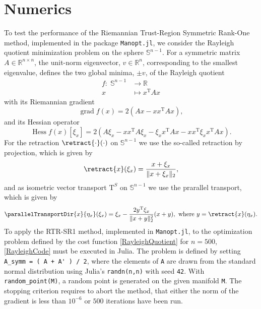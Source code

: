 \chapter{Numerics}

To test the performance of the Riemannian Trust-Region Symmetric Rank-One method, implemented in the package \lstinline!Manopt.jl!, we consider the Rayleigh quotient minimization problem on the sphere $\mathbb{S}^{n-1}$. For a symmetric matrix $A \in \mathbb{R}^{n \times n}$, the unit-norm eigenvector, $v \in \mathbb{R}^n$, corresponding to the smallest eigenvalue, defines the two global minima, $\pm v$, of the Rayleigh quotient  
\begin{equation}\label{RayleighQuotient}
    \begin{split}
        f \colon \; \mathbb{S}^{n-1} & \to \mathbb{R} \\
        x & \mapsto x^{\mathrm{T}} A x 
    \end{split}
\end{equation}   
with its Riemannian gradient 
\begin{equation*}
    \operatorname{grad} f(x) = 2(Ax - x x^{\mathrm{T}} A x),
\end{equation*}
and its Hessian operator
\begin{equation}\label{RayleighHessian}
    \operatorname{Hess} f(x) [\xi_x] = 2 (A \xi_x - x x^{\mathrm{T}} A \xi_x - \xi_x x^{\mathrm{T}} A x - x x^{\mathrm{T}} \xi_x x^{\mathrm{T}} A x).
\end{equation}
For the retraction $\retract{\cdot}(\cdot)$ on $\mathbb{S}^{n-1}$ we use the so-called retraction by projection, which is given by
\begin{equation*}
    \retract{x}(\xi_x) = \frac{x + \xi_x}{\lVert x + \xi_x \rVert_2},
\end{equation*}
and as isometric vector transport $\mathrm{T}^S$ on $\mathbb{S}^{n-1}$ we use the prarallel transport, which is given by 
\begin{equation*}
    \parallelTransportDir{x}{\eta_x}(\xi_x) = \xi_x - \frac{2 y^{\mathrm{T}} \xi_x}{\lVert x + y \rVert^{2}_2} (x + y), \text{ where } y = \retract{x}(\eta_x).
\end{equation*}
To apply the RTR-SR1 method, implemented in \lstinline!Manopt.jl!, to the optimization problem defined by the cost function \cref{RayleighQuotient} for $n=500$, \cref{RayleighCode} must be executed in Julia. The problem is defined by setting \lstinline!A_symm = ( A + A' ) / 2!, where the elements of \lstinline!A! are drawn from the standard normal distribution using Julia’s \lstinline!randn(n,n)! with seed \lstinline!42!. With \lstinline!random_point(M)!, a random point is generated on the given manifold \lstinline!M!. The stopping criterion requires to abort the method, that either the norm of the gradient is less than $10^{-6}$ or $500$ iterations have been run. \\
